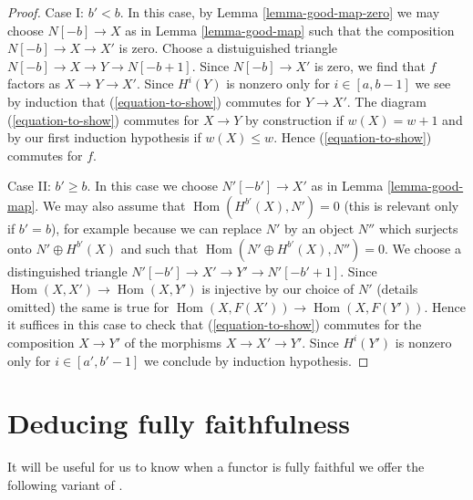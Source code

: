 \documentclass{stacks-project}
\theoremstyle{plain}
\theoremstyle{definition}
\theoremstyle{remark}
\numberwithin{equation}{subsection}
\def\Hom{\mathop{\mathrm{Hom}}\nolimits}
\begin{document}
\begin{proof}
\medskip\noindent
Case I: $b' < b$. In this case, by Lemma \ref{lemma-good-map-zero}
we may choose $N[-b] \to X$ as in Lemma \ref{lemma-good-map}
such that the composition $N[-b] \to X \to X'$ is zero.
Choose a distuiguished triangle $N[-b] \to X \to Y \to N[-b + 1]$. Since
$N[-b] \to X'$ is zero, we find that $f$ factors
as $X \to Y \to X'$. Since $H^i(Y)$ is nonzero only for $i \in [a, b - 1]$
we see by induction that (\ref{equation-to-show}) commutes for
$Y \to X'$. The diagram (\ref{equation-to-show}) commutes for
$X \to Y$ by construction if $w(X) = w + 1$ and by our first
induction hypothesis if $w(X) \leq w$.
Hence (\ref{equation-to-show}) commutes for $f$.

\medskip\noindent
Case II: $b' \geq b$. In this case we choose $N'[-b'] \to X'$
as in Lemma \ref{lemma-good-map}.
We may also assume that $\Hom(H^{b'}(X), N') = 0$ (this is
relevant only if $b' = b$), for example because we can
replace $N'$ by an object $N''$ which surjects onto $N' \oplus H^{b'}(X)$
and such that $\Hom(N' \oplus H^{b'}(X), N'') = 0$.
We choose a distinguished triangle
$N'[-b'] \to X' \to Y' \to N'[-b' + 1]$. Since
$\Hom(X, X') \to \Hom(X, Y')$ is injective by our choice of $N'$
(details omitted) the same is true for
$\Hom(X, F(X')) \to \Hom(X, F(Y'))$.
Hence it suffices in this case to check that
(\ref{equation-to-show}) commutes for the composition $X \to Y'$
of the morphisms $X \to X' \to Y'$.
Since $H^i(Y')$ is nonzero only for $i \in [a', b' - 1]$
we conclude by induction hypothesis.
\end{proof}










\section{Deducing fully faithfulness}
\label{section-get-fully-faithful}

\noindent
It will be useful for us to know when a functor is fully faithful
we offer the following variant of \cite[Lemma 2.15]{Orlov-K3}.
\end{document}
